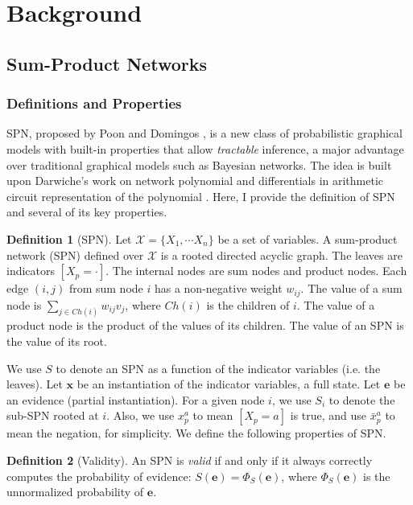 \documentclass[10pt, titlepage]{article}
\theoremstyle{definition}
\newtheorem{definition}{Definition}[section]
\newcommand\mb{\mathbf}
\begin{document}
\newpage
\section{Background}\label{section:background}

\subsection{Sum-Product Networks}\label{section:spn}

\subsubsection{Definitions and Properties}

SPN, proposed by Poon and Domingos \cite{poon2011sum}, is a new class of probabilistic graphical models with built-in properties that allow \textit{tractable} inference, a major advantage over traditional graphical models such as Bayesian networks. The idea is built upon Darwiche's work on network polynomial and differentials in arithmetic circuit representation of the polynomial \cite{darwiche2003differential}. Here, I provide the definition of SPN and several of its key properties.

\begin{definition}[SPN]
\cite{poon2011sum}
Let $\mathcal{X}=\{X_1,\cdots X_n\}$ be a set of variables. A sum-product network (SPN) defined over $\mathcal{X}$ is a rooted directed acyclic graph. The leaves are indicators $[X_p= \cdot ]$. The internal nodes are sum nodes and product nodes. Each edge $(i,j)$ from sum node $i$ has a non-negative weight $w_{ij}$. The value of a sum node is $\sum_{j\in Ch(i)}w_{ij}v_j$, where $Ch(i)$ is the children of $i$. The value of a product node is the product of the values of its children. The value of an SPN is the value of its root.
\end{definition}

We use $S$ to denote an SPN as a function of the indicator variables (i.e. the leaves). Let $\mb{x}$ be an instantiation of the indicator variables, a full state. Let $\mb{e}$ be an evidence (partial instantiation). For a given node $i$, we use $S_i$ to denote the sub-SPN rooted at $i$. Also, we use $x_{p}^a$ to mean $[X_p=a]$ is true, and use $\bar{x}_p^a$ to mean the negation, for simplicity. We define the following properties of SPN.

\begin{definition}[Validity]
An SPN is \textit{valid} if and only if it always correctly computes the probability of evidence: $S(\mb{e})=\Phi_S(\mb{e})$, where $\Phi_S(\mb{e})$ is the unnormalized probability of $\mb{e}$.
\end{definition}
\end{document}
